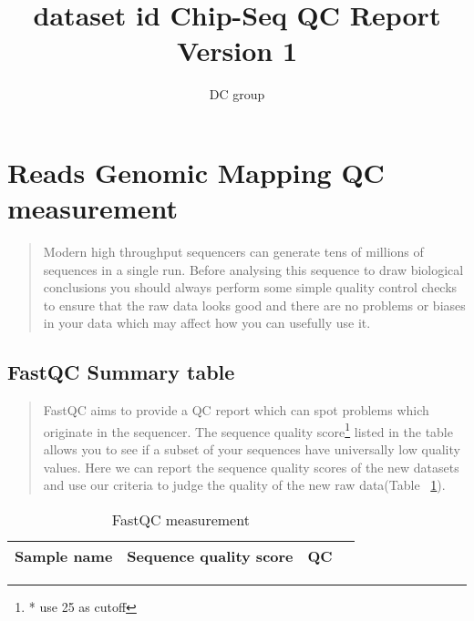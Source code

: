 \documentclass[11pt,a4paper]{article}
\begin{document}
\title{dataset id Chip-Seq QC Report Version 1}
\author {DC group}
\vspace{-1cm}
\maketitle
{}
\tableofcontents
\setcounter{tocdepth}{2}
\newpage

\section{Reads Genomic Mapping QC measurement}
\begin{quotation}
Modern high throughput sequencers can generate tens of millions of sequences in a single run. Before analysing this sequence to draw biological conclusions you should always perform some simple quality control checks to ensure that the raw data looks good and there are no problems or biases in your data which may affect how you can usefully use it.
\end{quotation}          



\subsection{FastQC Summary table}
\begin{quotation}
FastQC aims to provide a QC report which can spot problems which originate in the sequencer. 
The sequence quality score\footnote{* use 25 as cutoff}  listed in the table allows you to see if a subset of your sequences have universally low quality values. Here we can report the sequence quality scores of the new datasets and use our criteria to judge the quality of the new raw data(Table ~\ref{fastqctable}).\\
\end{quotation}
\begin{table}[h]
\caption{FastQC measurement}\label{fastqctable}
\begin{tabularx}{\textwidth}{ |X|X|X|X| } 
\hline
Sample name & Sequence quality score & QC \\
\hline
\end{tabularx}
\end{table}
\newpage	
\end{document}

